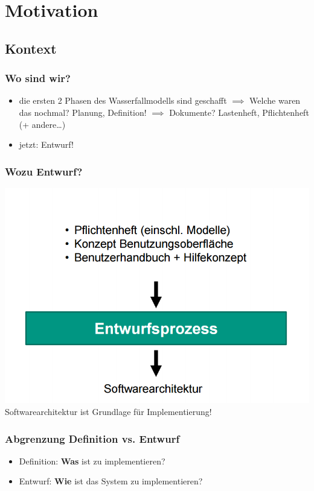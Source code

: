 \documentclass[18pt]{beamer}
\begin{document}
\section{Motivation}
	\subsection{Kontext}
		\begin{frame}
			\frametitle{Wo sind wir?}
			\begin{itemize}
				\item die ersten 2 Phasen des Wasserfallmodells sind geschafft
				\pause
				\linebreak $\implies$ Welche waren das nochmal? \pause Planung, Definition!
				\pause
				\linebreak $\implies$ Dokumente? \pause Lastenheft, Pflichtenheft (+ andere\dots)
				\pause
				\item  jetzt: Entwurf!
			\end{itemize}
		\end{frame}
	
		\begin{frame}
			\frametitle{Wozu Entwurf?}
			\centering
			\includegraphics[scale=0.4]{./pics/tut3/design.png} \linebreak
			Softwarearchitektur ist Grundlage für Implementierung!
		\end{frame}
	
		\begin{frame}
			\frametitle{Abgrenzung Definition vs. Entwurf}
			\begin{itemize}
				\item Definition: \textbf{Was} ist zu implementieren?
				\pause
				\item Entwurf: \textbf{Wie} ist das System zu implementieren?
			\end{itemize}
		\end{frame}
	
\end{document}
